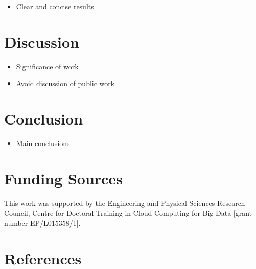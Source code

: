 \documentclass[final,3p,times,twocolumn,numbers]{elsarticle}
\begin{document}
\begin{itemize}
	\item Clear and concise results
\end{itemize}

\section{Discussion}
\label{sec:discussion}

\begin{itemize}
	\item Significance of work
	\item Avoid discussion of public work
\end{itemize}

\section{Conclusion}
\label{sec:conclusion}

\begin{itemize}
	\item Main conclusions
\end{itemize}

\section{Funding Sources}

This work was supported by the Engineering and Physical Sciences Research Council, Centre for Doctoral Training in Cloud Computing for Big Data [grant number EP/L015358/1].






   
  \section*{References}
  


%
%
%
\end{document}
